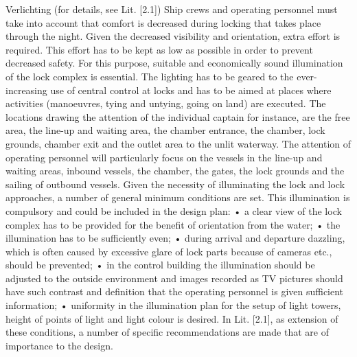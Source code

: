 Verlichting (for details, see Lit. [2.1])
Ship crews and operating personnel must take into account that comfort is decreased during locking that
takes place through the night. Given the decreased visibility and orientation, extra effort is required. This
effort has to be kept as low as possible in order to prevent decreased safety. For this purpose, suitable
and economically sound illumination of the lock complex is essential.
The lighting has to be geared to the ever-increasing use of central control at locks and has to be aimed
at places where activities (manoeuvres, tying and untying, going on land) are executed.
The locations drawing the attention of the individual captain for instance, are the free area, the line-up
and waiting area, the chamber entrance, the chamber, lock grounds, chamber exit and the outlet area
to the unlit waterway. The attention of operating personnel will particularly focus on the vessels in the
line-up and waiting areas, inbound vessels, the chamber, the gates, the lock grounds and the sailing of
outbound vessels.
Given the necessity of illuminating the lock and lock approaches, a number of general minimum conditions
are set. This illumination is compulsory and could be included in the design plan:
• a clear view of the lock complex has to be provided for the benefit of orientation from the water;
• the illumination has to be sufficiently even;
• during arrival and departure dazzling, which is often caused by excessive glare of lock parts because
of cameras etc., should be prevented;
• in the control building the illumination should be adjusted to the outside environment and images
recorded as TV pictures should have such contrast and definition that the operating personnel is given
sufficient information;
• uniformity in the illumination plan for the setup of light towers, height of points of light and light
colour is desired.
In Lit. [2.1], as extension of these conditions, a number of specific recommendations are made that are
of importance to the design.

